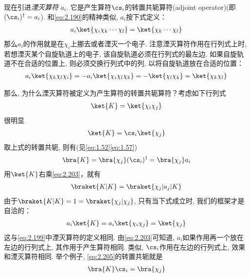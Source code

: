 现在引进\emph{湮灭算符} $a_i$. 
它是产生算符$\cs_i$的转置共轭算符(adjoint operator)(即$(\cs_i)^\dagger = a_i$). 
和\autoref{eq:2.190}的精神类似, 
$a_i$按下式定义：
\begin{align}\label{eq:2.199}
a_i \ket{\chi_i\chi_k\cdots\chi_l} = \ket{\chi_k\cdots\chi_l}
\end{align}
那么$a_i$的作用就是在$\chi_i$上挪去或者湮灭一个电子. 
注意湮灭算符作用在行列式上时, 
若想湮灭某个自旋轨道上的电子, 
该自旋轨道必须在行列式的最左边. 
如果自旋轨道不在合适的位置上, 
则必须交换行列式中的列, 
以将自旋轨道放在合适的位置：
\begin{align}
a_i \ket{\chi_k\chi_l\chi_i} = -a_i \ket{\chi_i\chi_l\chi_k} = -\ket{\chi_l\chi_k} = \ket{\chi_k\chi_l}
\end{align} 

那么, 
为什么湮灭算符被定义为产生算符的转置共轭算符？考虑如下行列式
\begin{align}
\ket{K} = \ket{\chi_i\chi_j}
\end{align}
很明显
\begin{align}
\ket{K} = \cs_i \ket{\chi_j} 
\end{align}
取上式的转置共轭, 
则有(见\autoref{eq:1.52}\autoref{eq:1.57})
\begin{align}\label{eq:2.203}
\bra{K} = \bra{\chi_j}(\cs_i)^\dagger = \bra{\chi_j}a_i
\end{align}
用$\ket{K}$右乘\autoref{eq:2.203}，就有
\begin{align}
\braket{K|K} = \braket{\chi_j|a_j|K}
\end{align}
由于$\braket{K|K} = 1 = \braket{\chi_j|\chi_j}$, 
只有当下式成立时, 
我们的框架才是自洽的：
\begin{align}\label{eq:2.205}
a_i\ket{K} = a_i\ket{\chi_i\chi_j} = \ket{\chi_j}
\end{align} 
这与\autoref{eq:2.199}中湮灭算符的定义相同. 
由\autoref{eq:2.203}可知道, 
$a_i$如果作用再一个放在左边的行列式上, 
其作用于产生算符相同. 
类似, 
$\cs_i$作用在左边的行列式上, 
效果和湮灭算符相同. 
举个例子, 
\autoref{eq:2.205}的转置共轭就是
\begin{align}
\bra{K}\cs_i = \bra{\chi_j}
\end{align}


